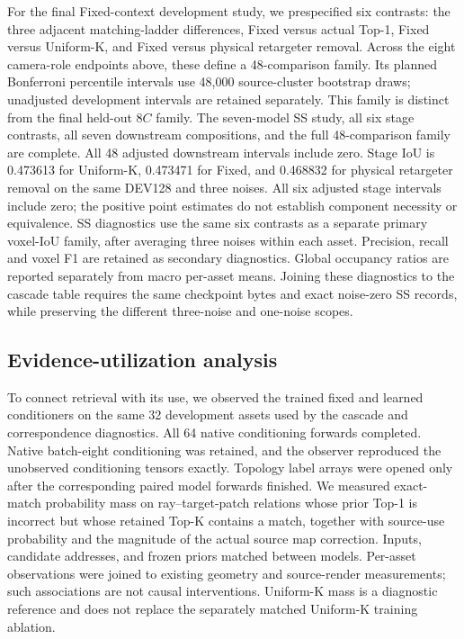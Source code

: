 \documentclass[10pt]{article}
\begin{document}
For the final Fixed-context development study, we prespecified six
contrasts: the three adjacent matching-ladder differences, Fixed versus
actual Top-1, Fixed versus Uniform-K, and Fixed versus physical retargeter
removal. Across the eight camera-role endpoints above, these define a
48-comparison family. Its planned Bonferroni percentile intervals use 48,000
source-cluster bootstrap draws; unadjusted development intervals are retained
separately. This family is distinct from the final held-out $8C$ family.
The seven-model SS study, all six stage contrasts, all seven downstream
compositions, and the full 48-comparison family are complete. All 48 adjusted
downstream intervals include zero. Stage IoU is 0.473613 for Uniform-K, 0.473471 for
Fixed, and 0.468832 for physical retargeter removal on the same DEV128 and
three noises. All six adjusted stage intervals include zero; the positive
point estimates do not establish component necessity or equivalence.
SS diagnostics use the same six contrasts as a separate primary voxel-IoU
family, after averaging three noises within each asset. Precision, recall and
voxel F1 are retained as secondary diagnostics. Global occupancy ratios are
reported separately from macro per-asset means. Joining these diagnostics
to the cascade table requires the same checkpoint bytes and exact noise-zero
SS records, while preserving the different three-noise and one-noise scopes.

\subsection{Evidence-utilization analysis}
To connect retrieval with its use, we observed the trained fixed and
learned conditioners on the same 32 development assets used by the cascade
and correspondence diagnostics. All 64 native conditioning forwards completed.
Native batch-eight conditioning was retained, and the observer reproduced
the unobserved conditioning tensors exactly. Topology label arrays were opened
only after the corresponding paired model forwards finished.
We measured exact-match probability mass on ray--target-patch relations
whose prior Top-1 is incorrect but whose retained Top-K contains a match,
together with source-use probability and the magnitude of the actual source
map correction. Inputs, candidate addresses, and frozen priors matched
between models. Per-asset observations were joined to existing geometry and
source-render measurements; such associations are not causal interventions.
Uniform-K mass is a diagnostic reference and does not replace the separately
matched Uniform-K training ablation.
\end{document}
